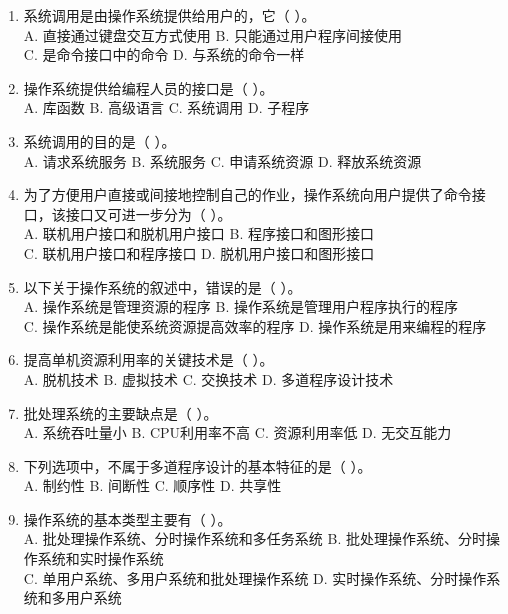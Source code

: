\documentclass[lang=cn,newtx,10pt,scheme=chinese]{../../elegantbook}
\begin{document}
\begin{enumerate}
  \item 系统调用是由操作系统提供给用户的，它（ ）。\\
  A. 直接通过键盘交互方式使用 \quad B. 只能通过用户程序间接使用\\
  C. 是命令接口中的命令 \quad D. 与系统的命令一样

  \item 操作系统提供给编程人员的接口是（ ）。\\
  A. 库函数 \quad B. 高级语言 \quad C. 系统调用 \quad D. 子程序

  \item 系统调用的目的是（ ）。\\
  A. 请求系统服务 \quad B. 系统服务 \quad C. 申请系统资源 \quad D. 释放系统资源
  \item 为了方便用户直接或间接地控制自己的作业，操作系统向用户提供了命令接口，该接口又可进一步分为（ ）。\\
  A. 联机用户接口和脱机用户接口 \quad B. 程序接口和图形接口\\
  C. 联机用户接口和程序接口 \quad D. 脱机用户接口和图形接口

  \item 以下关于操作系统的叙述中，错误的是（ ）。\\
  A. 操作系统是管理资源的程序 \quad B. 操作系统是管理用户程序执行的程序\\
  C. 操作系统是能使系统资源提高效率的程序 \quad D. 操作系统是用来编程的程序

  \item 提高单机资源利用率的关键技术是（ ）。\\
  A. 脱机技术 \quad B. 虚拟技术 \quad C. 交换技术 \quad D. 多道程序设计技术

  \item 批处理系统的主要缺点是（ ）。\\
  A. 系统吞吐量小 \quad B. CPU利用率不高 \quad C. 资源利用率低 \quad D. 无交互能力

  \item 下列选项中，不属于多道程序设计的基本特征的是（ ）。\\
  A. 制约性 \quad B. 间断性 \quad C. 顺序性 \quad D. 共享性
  \item 操作系统的基本类型主要有（ ）。\\
  A. 批处理操作系统、分时操作系统和多任务系统 \quad 
  B. 批处理操作系统、分时操作系统和实时操作系统\\
  C. 单用户系统、多用户系统和批处理操作系统 \quad 
  D. 实时操作系统、分时操作系统和多用户系统


\end{enumerate}
\end{document}
